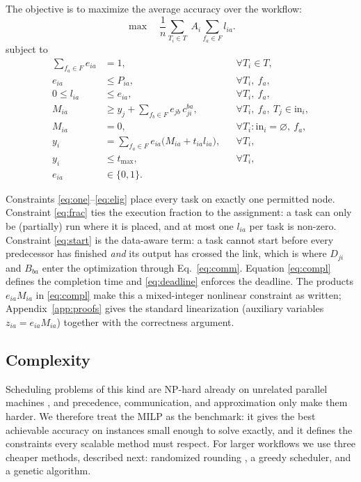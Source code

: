 \documentclass[conference]{IEEEtran}
\begin{document}
The objective is to maximize the average accuracy over the workflow:
\begin{equation}
 \max \quad \frac{1}{n}\sum_{T_i\in T}\; A_i\sum_{f_a\in F} l_{ia}.
\label{eq:obj}
\end{equation}
subject to
\begin{align}
 \sum_{f_a\in F} e_{ia} &=1, && \forall T_i\in T, \label{eq:one}\\
 e_{ia} &\le P_{ia}, && \forall T_i,\ f_a, \label{eq:elig}\\
 0\le l_{ia} &\le e_{ia}, && \forall T_i,\ f_a, \label{eq:frac}\\
 M_{ia} &\ge y_j+\sum_{f_b\in F} e_{jb}\,c_{ji}^{ba}, && \forall T_i,\ f_a,\ T_j\in\mathrm{in}_i, \label{eq:start}\\
 M_{ia} &=0, && \forall T_i:\mathrm{in}_i=\varnothing,\ f_a, \label{eq:startsrc}\\
 y_i &=\sum_{f_a\in F} e_{ia}\bigl(M_{ia}+t_{ia}l_{ia}\bigr), && \forall T_i, \label{eq:compl}\\
 y_i &\le t_{\max}, && \forall T_i, \label{eq:deadline}\\
 e_{ia} &\in\{0,1\}. && \label{eq:bin}
\end{align}

Constraints \eqref{eq:one}--\eqref{eq:elig} place every task on exactly one permitted node. Constraint \eqref{eq:frac} ties the execution fraction to the assignment: a task can only be (partially) run where it is placed, and at most one $l_{ia}$ per task is non-zero. Constraint \eqref{eq:start} is the data-aware term: a task cannot start before every predecessor has finished \emph{and} its output has crossed the link, which is where $D_{ji}$ and $B_{ba}$ enter the optimization through Eq.~\eqref{eq:comm}. Equation \eqref{eq:compl} defines the completion time and \eqref{eq:deadline} enforces the deadline. The products $e_{ia}M_{ia}$ in \eqref{eq:compl} make this a mixed-integer nonlinear constraint as written; Appendix~\ref{app:proofs} gives the standard linearization (auxiliary variables $z_{ia}=e_{ia}M_{ia}$) together with the correctness argument.

\subsection{Complexity}

Scheduling problems of this kind are NP-hard already on unrelated parallel machines \cite{lenstra1990approximation}, and precedence, communication, and approximation only make them harder. We therefore treat the MILP as the benchmark: it gives the best achievable accuracy on instances small enough to solve exactly, and it defines the constraints every scalable method must respect. For larger workflows we use three cheaper methods, described next: randomized rounding \cite{raghavan1987randomized}, a greedy scheduler, and a genetic algorithm.
\end{document}
